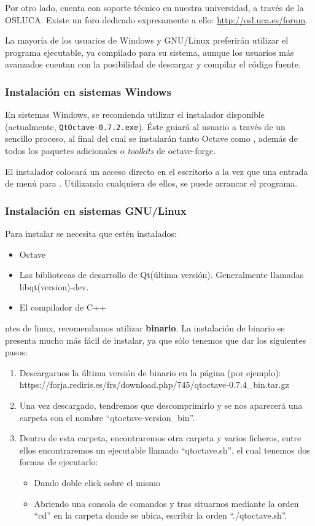 Por otro lado, \qtoctave cuenta con soporte técnico en nuestra
universidad, a través de la OSLUCA. Existe un foro dedicado
expresamente a ello: \url{http://osl.uca.es/forum}.

La mayoría de los usuarios de Windows y GNU/Linux preferirán utilizar
el programa ejecutable, ya compilado para su sistema, aunque los
usuarios más avanzados cuentan con la posibilidad de descargar y
compilar el código fuente.

\subsubsection*{Instalación en sistemas Windows}
En sistemas Windows, se recomienda utilizar el instalador disponible
(actualmente, \texttt{QtOctave-0.7.2.exe}). Éste guiará al usuario a
través de un sencillo proceso, al final del cual se instalarán tanto
Octave como \qtoctave, además de todos los paquetes adicionales o
\textit{toolkits} de octave-forge.

El instalador colocará un acceso directo en el escritorio a la vez que
una entrada de menú para \qtoctave. Utilizando cualquiera de ellos, se
puede arrancar el programa.


\subsubsection{Instalación en sistemas GNU/Linux}

Para instalar \qtoctave se necesita que estén instalados:

\begin{itemize}
\item Octave
\item Las bibliotecas de desarrollo de Qt(última versión). Generalmente llamadas libqt(version)-dev.
\item El compilador de C++
\end{itemize}

ntes de linux, recomendamos utilizar {\bf
  \qtoctave binario}. La instalación de \qtoctave binario se presenta
mucho más fácil de instalar, ya que sólo tenemos que dar los
siguientes pasos: 

\begin{enumerate}
\item Descargarnos la última versión de \qtoctave binario en la página (por ejemplo): https://forja.rediris.es/frs/download.php/745/qtoctave-0.7.4\_bin.tar.gz
\item Una vez descargado, tendremos que descomprimirlo y se nos aparecerá una carpeta con el nombre ``qtoctave-version\_bin''.
\item Dentro de esta carpeta, encontraremos otra carpeta y varios ficheros, entre ellos encontraremos un ejecutable llamado ``qtoctave.sh'', el cual tenemos dos formas de ejecutarlo:
\begin{itemize}
\item Dando doble click sobre el mismo
\item Abriendo una consola de comandos y tras situarnos mediante la orden ``cd'' en la carpeta donde se ubica, escribir la orden ``./qtoctave.sh''.
\end{itemize}
\end{enumerate}

